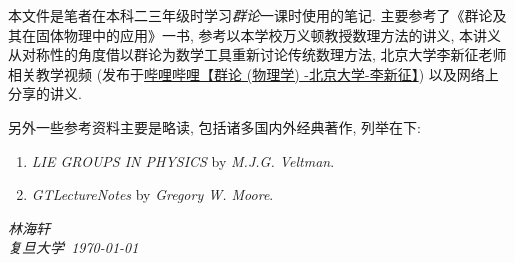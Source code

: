     本文件是笔者在本科二三年级时学习\emph{群论}一课时使用的笔记. 主要参考了《群论及其在固体物理中的应用》\cite{Xu1994}一书, 参考以本学校万义顿教授数理方法的讲义\cite{Wan2024}, 本讲义从对称性的角度借以群论为数学工具重新讨论传统数理方法, 北京大学李新征老师相关教学视频 (发布于\href{https://www.bilibili.com/video/BV1Ux4y177BH?vd_source=d630661fd733349495a9252445d0c4a4}{哔哩哔哩【群论 (物理学) -北京大学-李新征】}) 以及网络上分享的讲义.

    另外一些参考资料主要是略读, 包括诸多国内外经典著作, 列举在下:
    \begin{enumerate}
        \item \textit{LIE GROUPS IN PHYSICS} by \textit{M.J.G. Veltman}.
        \item \textit{GTLectureNotes} by \textit{Gregory W. Moore}.
    \end{enumerate}

    \vspace{2cm}
    \begin{flushright}
        \textit{林海轩} \\[1em]
        \textit{复旦大学\ \today}
    \end{flushright}